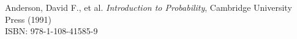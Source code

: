 \documentclass[12pt]{book}
\begin{document}
\backmatter
\begin{thebibliography}{99}
Anderson, David F., et al. \emph{Introduction to Probability}, Cambridge University Press (1991) \\
ISBN: 978-1-108-41585-9
\end{thebibliography}
\end{document}
